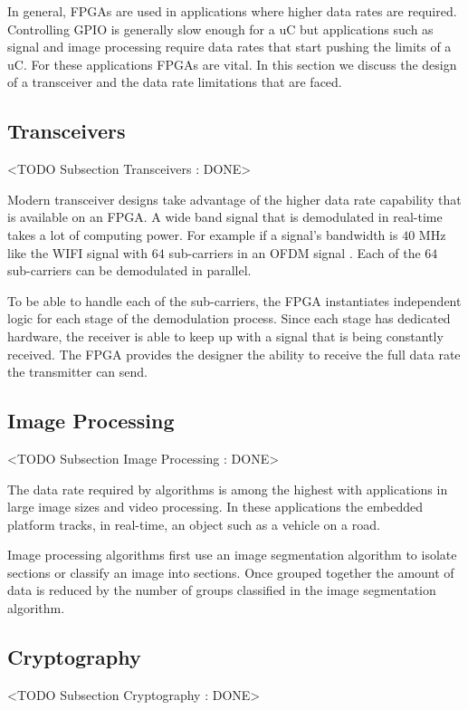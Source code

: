 In general, \ac{FPGA}s are used in applications where higher data rates are required. Controlling \ac{GPIO} is generally slow enough for a \ac{uC} but applications such as signal and image processing require data rates that start pushing the limits of a \ac{uC}. For these applications \ac{FPGA}s are vital. In this section we discuss the design of a transceiver and the data rate limitations that are faced. 

\subsection{Transceivers}
	<TODO Subsection Transceivers : DONE>
	
Modern transceiver designs take advantage of the higher data rate capability that is available on an \ac{FPGA}. A wide band signal that is demodulated in real-time takes a lot of computing power. For example if a signal's bandwidth is $40$ \ac{MHz} like the \ac{WIFI} signal with $64$ sub-carriers in an \ac{OFDM} signal \cite{wifistd}. Each of the $64$ sub-carriers can be demodulated in parallel. 

To be able to handle each of the sub-carriers, the \ac{FPGA} instantiates independent logic for each stage of the demodulation process. Since each stage has dedicated hardware, the receiver is able to keep up with a signal that is being constantly received. The \ac{FPGA} provides the designer the ability to receive the full data rate the transmitter can send. 	
	
\subsection{Image Processing}
	<TODO Subsection Image Processing : DONE>
	
The data rate required by  algorithms is among the highest with applications in large image sizes and video processing. In these applications the embedded platform tracks, in real-time, an object such as a vehicle on a road. 

Image processing algorithms first use an image segmentation algorithm to isolate sections or classify an image into sections. Once grouped together the amount of data is reduced by the number of groups classified in the image segmentation algorithm.

\subsection{Cryptography}
	<TODO Subsection Cryptography : DONE>

